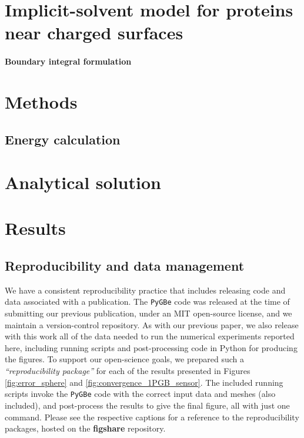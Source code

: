 \documentclass[final,5p,times,twocolumn]{elsarticle}
\newcommand{\pygbe}{\texttt{PyGBe}\xspace}
\begin{document}
\section{Implicit-solvent model for proteins near charged surfaces} \label{sec:implicit_solvent}
    

\paragraph*{Boundary integral formulation} \label{sec:bie}



\section{Methods}\label{sec:methods}

\subsection{Energy calculation} \label{sec:energy}




\section{Analytical solution} \label{sec:analytical_solution}


\section{Results} \label{sec:results}


\subsection{Reproducibility and data management}
We have a consistent reproducibility practice that includes releasing code and data associated with a publication. The \pygbe code was released at the time of submitting our previous publication,\cite{CooperBardhanBarba2013} under an MIT open-source license, and we maintain a version-control repository. As with our previous paper, we also release with this work all of the data needed to run the numerical experiments reported here, including running scripts and post-processing code in Python for producing the figures. To support our open-science goals, we prepared such a \emph{``reproducibility package''} for each of the results presented in Figures \ref{fig:error_sphere} and \ref{fig:convergence_1PGB_sensor}. The included running scripts invoke the \pygbe code with the correct input data and meshes (also included), and post-process the results to give the final figure, all with just one command. Please see the respective captions for a reference to the reproducibility packages, hosted on the \textbf{figshare} repository.
\end{document}
